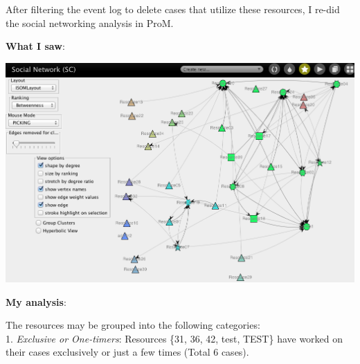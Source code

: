 \documentclass[]{article}
\begin{document}
After filtering the event log to delete cases that utilize these
resources, I re-did the social networking analysis in ProM.

\textbf{What I saw}:

\includegraphics{CoSeLoG_Step_07_excl_one-timers_SocialNet.png}

\textbf{My analysis}:

The resources may be grouped into the following categories:\\1.
\emph{Exclusive or One-timers}: Resources \{31, 36, 42, test, TEST\}
have worked on their cases exclusively or just a few times (Total 6
cases).
\end{document}
